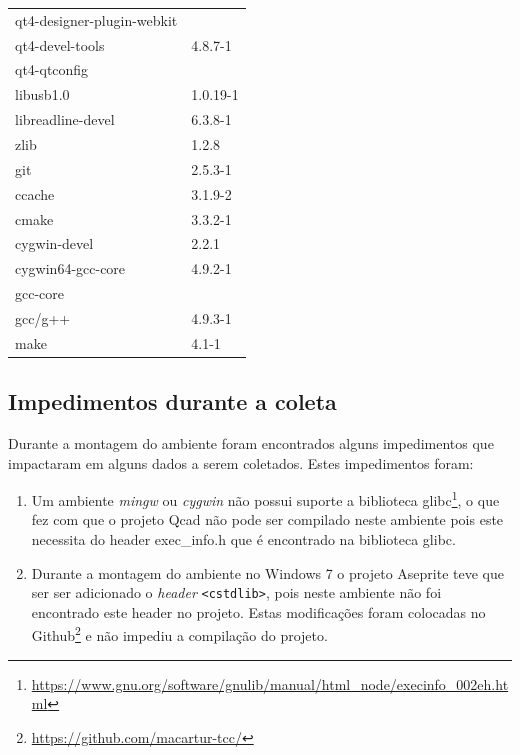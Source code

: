 \begin{itemize}
\begin{table}[h]
\begin{tabular}{ll}
qt4-designer-plugin-webkit  & \\
qt4-devel-tools & 4.8.7-1 \\ 
qt4-qtconfig & \\ \midrule

libusb1.0 & 1.0.19-1 \\ \midrule


libreadline-devel & 6.3.8-1 \\ \midrule

zlib & 1.2.8 \\ \midrule
git & 2.5.3-1 \\ \midrule
ccache & 3.1.9-2 \\ \midrule
cmake & 3.3.2-1 \\ \midrule
cygwin-devel & 2.2.1 \\ \midrule
cygwin64-gcc-core & 4.9.2-1 \\ \midrule
gcc-core & \\ \midrule
gcc/g++ & 4.9.3-1 \\ 
make & 4.1-1 \\ \bottomrule
\end{tabular} 
\end{table}
\end{itemize}

\subsection{Impedimentos durante a coleta}

	Durante a montagem do ambiente foram encontrados
 alguns impedimentos que impactaram em alguns dados a serem coletados.
Estes impedimentos foram:
 
	\begin{enumerate}[label=\roman* )]
		\item Um ambiente \textit{mingw} ou \textit{cygwin} não possui suporte
 a biblioteca glibc\footnote{\url{https://www.gnu.org/software/gnulib/manual/html\_node/execinfo\_002eh.html}},
 o que fez com que o projeto Qcad não pode ser compilado neste ambiente pois este necessita do header exec\_info.h que é encontrado na biblioteca glibc.
		\item Durante a montagem do ambiente no Windows 7 o projeto Aseprite teve que ser  
 ser adicionado o \textit{header} \texttt{<cstdlib>}, pois neste ambiente não foi
 encontrado este header no projeto. Estas modificações foram colocadas no
 Github\footnote{\url{https://github.com/macartur-tcc/}} e não impediu a
 compilação do projeto.
	\end{enumerate}

